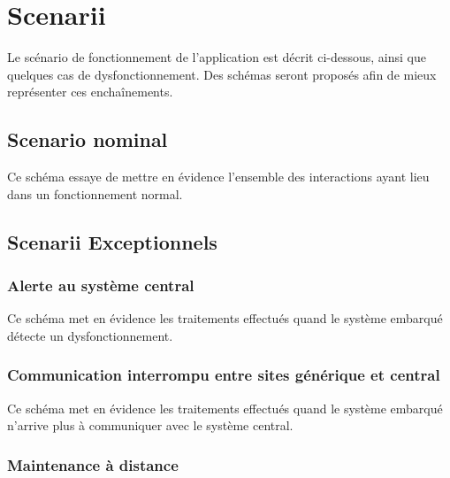 \section{Scenarii}

Le scénario de fonctionnement de l'application est décrit ci-dessous, ainsi que quelques
cas de dysfonctionnement. Des schémas seront proposés afin de mieux représenter ces enchaînements.

    \subsection{Scenario nominal}
Ce schéma essaye de mettre en évidence l'ensemble des interactions ayant lieu dans un fonctionnement normal.

    \subsection{Scenarii Exceptionnels}

            \subsubsection{Alerte au système central}
Ce schéma met en évidence les traitements effectués quand le système embarqué détecte un dysfonctionnement.

            \subsubsection{Communication interrompu entre sites générique et central}
Ce schéma met en évidence les traitements effectués quand le système embarqué n'arrive plus à communiquer 
avec le système central.

            \subsubsection{Maintenance à distance}

